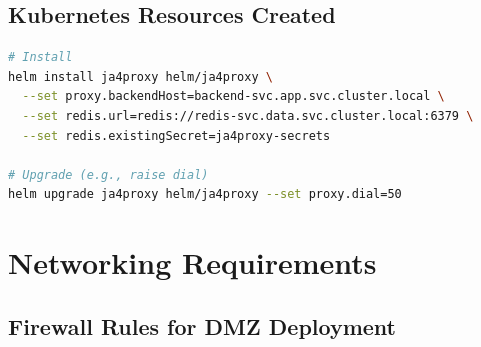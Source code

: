 \subsection{Kubernetes Resources Created}

\begin{lstlisting}[language=bash]
# Install
helm install ja4proxy helm/ja4proxy \
  --set proxy.backendHost=backend-svc.app.svc.cluster.local \
  --set redis.url=redis://redis-svc.data.svc.cluster.local:6379 \
  --set redis.existingSecret=ja4proxy-secrets

# Upgrade (e.g., raise dial)
helm upgrade ja4proxy helm/ja4proxy --set proxy.dial=50
\end{lstlisting}

\section{Networking Requirements}

\subsection{Firewall Rules for DMZ Deployment}

